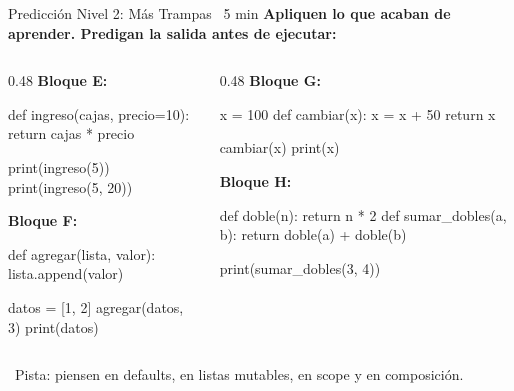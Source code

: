 \documentclass[aspectratio=169, 11pt]{beamer}
\begin{document}
\begin{frame}[fragile,shrink=30]{Predicción Nivel 2: Más Trampas \hfill
    {\normalsize\color{arcaRed}\faClock\ 5 min}}
  \vspace{-6pt}
  {\footnotesize\color{arcaDark}\bfseries
    Apliquen lo que acaban de aprender.
    Predigan la salida \textbf{antes} de ejecutar:}

  \vspace{2pt}
  \begin{columns}[T]
    \begin{column}{0.48\textwidth}
      {\scriptsize\color{arcaRed}\bfseries Bloque E:}
      \begin{pyblock}
def ingreso(cajas, precio=10):
    return cajas * precio

print(ingreso(5))
print(ingreso(5, 20))
      \end{pyblock}

      \vspace{2pt}
      {\scriptsize\color{arcaRed}\bfseries Bloque F:}
      \begin{pyblock}
def agregar(lista, valor):
    lista.append(valor)

datos = [1, 2]
agregar(datos, 3)
print(datos)
      \end{pyblock}
    \end{column}

    \begin{column}{0.48\textwidth}
      {\scriptsize\color{arcaRed}\bfseries Bloque G:}
      \begin{pyblock}
x = 100
def cambiar(x):
    x = x + 50
    return x

cambiar(x)
print(x)
      \end{pyblock}

      \vspace{2pt}
      {\scriptsize\color{arcaRed}\bfseries Bloque H:}
      \begin{pyblock}
def doble(n):
    return n * 2
def sumar_dobles(a, b):
    return doble(a) + doble(b)

print(sumar_dobles(3, 4))
      \end{pyblock}
    \end{column}
  \end{columns}

  \vspace{2pt}
  {\scriptsize\color{textMuted}
    \faLightbulb\ Pista: piensen en defaults, en listas mutables,
    en scope y en composición.}
\end{frame}
\end{document}
